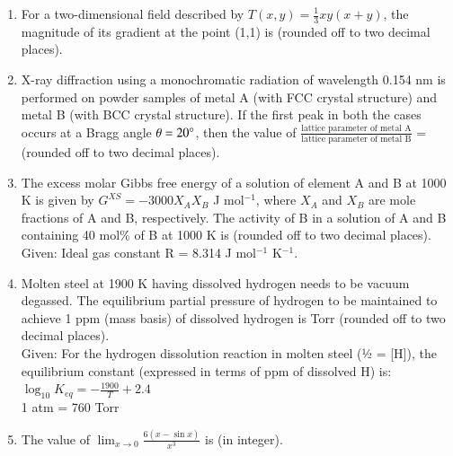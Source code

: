 \documentclass[journal]{IEEEtran}
\theoremstyle{remark}
\begin{document}
\begin{enumerate}[resume]
\item For a two-dimensional field described by $T(x, y) = \frac{1}{3}xy(x + y)$, the magnitude of its gradient at the point (1,1) is \underline{\hspace{2cm}} (rounded off to two decimal places). \hfill{}

\item X-ray diffraction using a monochromatic radiation of wavelength 0.154 nm is performed on powder samples of metal A (with FCC crystal structure) and metal B (with BCC crystal structure). If the first peak in both the cases occurs at a Bragg angle $\theta = 20\degree$, then the value of $\frac{\text{lattice parameter of metal A}}{\text{lattice parameter of metal B}}$ = \underline{\hspace{2cm}} (rounded off to two decimal places). \hfill{}

\item The excess molar Gibbs free energy of a solution of element A and B at 1000 K is given by $G^{XS} = -3000 X_A X_B$ J mol$^{-1}$, where $X_A$ and $X_B$ are mole fractions of A and B, respectively. The activity of B in a solution of A and B containing 40 mol\% of B at 1000 K is \underline{\hspace{2cm}} (rounded off to two decimal places). \hfill{} \\
Given: Ideal gas constant R = 8.314 J mol$^{-1}$ K$^{-1}$.

\item Molten steel at 1900 K having dissolved hydrogen needs to be vacuum degassed. The equilibrium partial pressure of hydrogen to be maintained to achieve 1 ppm (mass basis) of dissolved hydrogen is \underline{\hspace{2cm}} Torr (rounded off to two decimal places). \hfill{} \\
Given: For the hydrogen dissolution reaction in molten steel (½  = [H]), the equilibrium constant (expressed in terms of ppm of dissolved H) is: \\
$\log_{10} K_{eq} = -\frac{1900}{T} + 2.4$ \\
1 atm = 760 Torr

\item The value of $\lim_{x\to0} \frac{6(x-\sin x)}{x^3}$ is \underline{\hspace{2cm}} (in integer). \hfill{}


\end{enumerate}
\end{document}
